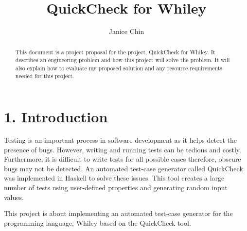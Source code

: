 \documentclass[11pt, a4paper, twoside, openright]{report}
\title{QuickCheck for Whiley}
\author{Janice Chin}
\date{}
\begin{document}
\frontmatter


\begin{abstract}
   This document is a project proposal for the project, QuickCheck for Whiley. It describes an engineering problem and how this project will solve the problem. It will also explain how to evaluate my proposed solution and any resource requirements needed for this project.
\end{abstract}


\maketitle




\mainmatter


\section*{1. Introduction}
Testing is an important process in software development as it helps detect the presence of bugs. However, writing and running tests can be tedious and costly. Furthermore, it is difficult to write tests for all possible cases therefore, obscure bugs may not be detected. An automated test-case generator called QuickCheck was implemented in Haskell to solve these issues. This tool creates a large number of tests using user-defined properties and generating random input values.

This project is about implementing an automated test-case generator for the programming language, Whiley based on the QuickCheck tool.

%
%
%
\end{document}
